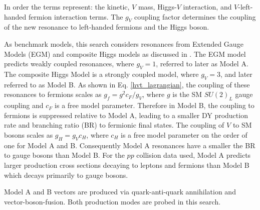 In order the terms represent: the kinetic, $V$ mass, Higgs-$V$ interaction, and $V$-left-handed fermion interaction terms. The $g_{V}$ coupling factor determines the coupling of the new resonance to left-handed fermions and the Higgs boson. 

As benchmark models, this search considers resonances from Extended Gauge Models (EGM) and composite Higgs models as discussed in \cite{hvt} . The EGM model predicts weakly coupled resonances, where $g_{V} = 1$, referred to later as Model A. The composite Higgs Model is a strongly coupled model, where $g_{V}=3$, and later referred to as Model B. 
As shown in Eq. \ref{hvt_lagrangian}, the coupling of these resonances to fermions scales as $g_{f} = g^{2}c_{F}/g_{V}$, where $g$ is the SM $SU(2)_{L}$ gauge coupling and $c_{F}$ is a free model parameter. Therefore in Model B, the coupling to fermions is suppressed relative to Model A, leading to a smaller DY production rate and branching ratio (BR) to fermionic final states. The coupling of $V$ to SM bosons scales as $g_{H}=g_{V}c_{H}$, where $c_{H}$ is a free model parameter on the order of one for Model A and B. Consequently Model A resonances have a smaller the BR to gauge bosons than Model B. For the $pp$ collision data used, Model A predicts larger production cross sections decaying to leptons and fermions than Model B which decays primarily to gauge bosons.

Model A and B vectors are produced via quark-anti-quark annihilation and vector-boson-fusion. Both production modes are probed in this search. 

